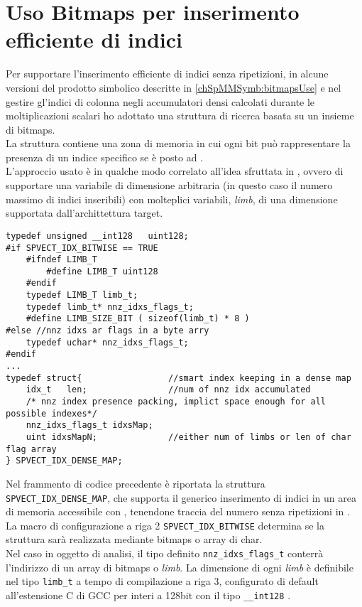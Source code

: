 \section{Uso Bitmaps per inserimento efficiente di indici}	\label{chSpMMAux:bitmapInsert}
Per supportare l'inserimento efficiente di indici senza ripetizioni,
in alcune versioni del prodotto simbolico descritte in \ref{chSpMMSymb:bitmapsUse} e nel gestire gl'indici di colonna 
negli accumulatori densi calcolati durante le moltiplicazioni scalari ho adottato
una struttura di ricerca basata su un insieme di bitmaps.\\
La struttura contiene una zona di memoria in cui ogni bit può rappresentare la presenza di un indice specifico
se è posto ad .\\
L'approccio usato è in qualche modo correlato all'idea sfruttata in \cite{GMP},
ovvero di supportare una variabile di dimensione arbitraria (in questo caso il numero massimo di indici inseribili)
con molteplici variabili, \emph{limb}, di una dimensione supportata dall'archittettura target.\\
\begin{lstlisting}
typedef unsigned __int128	uint128;
#if SPVECT_IDX_BITWISE == TRUE
	#ifndef LIMB_T
		#define LIMB_T uint128
	#endif
	typedef LIMB_T limb_t;
	typedef limb_t* nnz_idxs_flags_t;
	#define LIMB_SIZE_BIT ( sizeof(limb_t) * 8 )
#else //nnz idxs ar flags in a byte arry
	typedef uchar* nnz_idxs_flags_t;
#endif
...
typedef struct{					//smart index keeping in a dense map
	idx_t	len;				//num of nnz idx accumulated
	/* nnz index presence packing, implict space enough for all possible indexes*/
	nnz_idxs_flags_t idxsMap;
	uint idxsMapN;				//either num of limbs or len of char flag array
} SPVECT_IDX_DENSE_MAP;
\end{lstlisting}
Nel frammento di codice precedente è riportata la struttura \verb|SPVECT_IDX_DENSE_MAP|, che supporta
il generico inserimento di indici in un area di memoria accessibile con , 
tenendone traccia del numero senza ripetizioni in .\\
La macro di configurazione a riga 2 \verb|SPVECT_IDX_BITWISE| determina se la struttura sarà realizzata
mediante bitmaps o array di char.\\
Nel caso in oggetto di analisi, il tipo definito \verb|nnz_idxs_flags_t| conterrà l'indirizzo
di un array di bitmaps o \emph{limb}.
La dimensione di ogni \emph{limb} è definibile nel tipo \verb|limb_t| a tempo di compilazione a riga 3, 
configurato di default all'estensione C di GCC per interi a 128bit con il tipo \verb|__int128| \cite{gcc10.1}.\\
